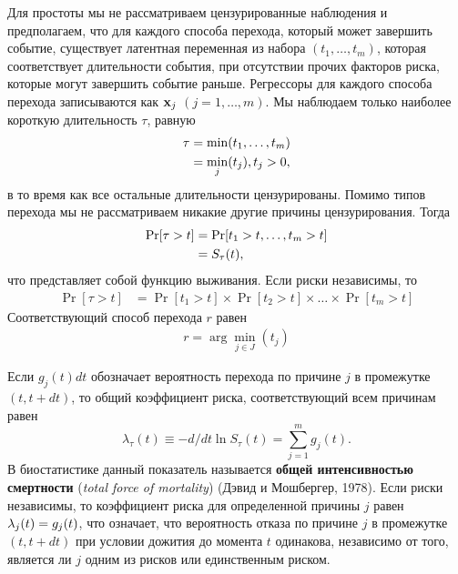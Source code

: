 Для простоты мы не рассматриваем цензурированные наблюдения и предполагаем, что для каждого способа перехода, который может завершить событие, существует латентная переменная из набора $(t_1, \ldots , t_m)$, которая соответствует длительности события, при отсутствии прочих факторов риска, которые могут завершить событие раньше. Регрессоры для каждого способа перехода записываются как $\mathbf{x}_j$ $(j = 1, \ldots , m)$. Мы наблюдаем только наиболее короткую длительность $\tau$, равную
    \begin{align}
    \label{eq:19.1}
    \tau    &= \min(t_1, \ldots , t_m)\\
            &= \min_{j}(t_j), t_j > 0, \notag
    \end{align}
в то время как все остальные длительности цензурированы. Помимо типов перехода мы не рассматриваем никакие другие причины цензурирования. Тогда
    \begin{align}
    \label{eq:19.2}
    \Pr[\tau > t]   &= \Pr[t_1 > t, \ldots ,  t_m > t]\\
                    &= S_{\tau}(t), \notag
    \end{align}
что представляет собой функцию выживания. Если риски независимы, то
    \begin{align}
    \label{eq:19.3}
    \Pr [\tau > t]  &= \Pr [t_1 > t] \times \Pr [t_2 > t] \times \ldots  \times \Pr [t_m > t]
    \end{align}
Соответствующий способ перехода $r$ равен
    \begin{align}
    \label{eq:19.4}
    r = \arg \min_{j \in J}(t_j)
    \end{align}

Если $g_j(t)dt$ обозначает вероятность перехода по причине $j$ в промежутке $(t, t + dt)$, то общий коэффициент риска, соответствующий всем причинам равен
    $$\lambda_\tau(t) \equiv - d/dt \ln S_\tau(t) = \sum_{j=1}^m g_j(t).$$
В биостатистике данный показатель называется \textbf{общей интенсивностью смертности} (\textit{total force of mortality}) (Дэвид и Мошбергер, 1978). Если риски независимы, то коэффициент риска для определенной причины $j$ равен $\lambda_j(t) = g_j(t)$, что означает, что вероятность отказа по причине $j$ в промежутке $(t, t + dt)$ при условии дожития до момента $t$ одинакова, независимо от того, является ли $j$ одним из рисков или единственным риском.

